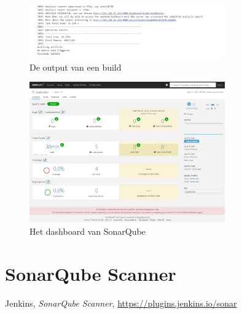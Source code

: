 \documentclass[12pt]{article}
\begin{document}
\begin{figure}[H]
	\begin{center}
		\includegraphics[width=0.75\textwidth]{images/succes.PNG}
		\caption{De output van een build\label{fig:succes}}
	\end{center}
\end{figure}


\begin{figure}[H]
	\begin{center}
		\includegraphics[width=0.75\textwidth]{images/sonarqube_dashboard.png}
		\caption{Het dashboard van SonarQube\label{fig:succes}}
	\end{center}
\end{figure}





\section{SonarQube Scanner}







\begin{thebibliography}{9}
	Jenkins,
	\textit{SonarQube Scanner},
	\url{https://plugins.jenkins.io/sonar}
\end{thebibliography}
\end{document}
